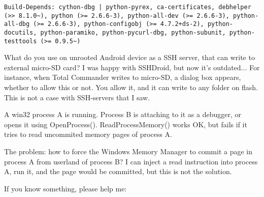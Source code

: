 \begin{lstlisting}
Build-Depends: cython-dbg | python-pyrex, ca-certificates, debhelper (>> 8.1.0~), python (>= 2.6.6-3), python-all-dev (>= 2.6.6-3), python-all-dbg (>= 2.6.6-3), python-configobj (>= 4.7.2+ds-2), python-docutils, python-paramiko, python-pycurl-dbg, python-subunit, python-testtools (>= 0.9.5~)
\end{lstlisting}

\myhrule{}

What do you use on unrooted Android device as a SSH server, that can write to external micro-SD card?
I was happy with SSHDroid, but now it's outdated...
For instance, when Total Commander writes to micro-SD, a dialog box appears, whether to allow this or not.
You allow it, and it can write to any folder on flash.
This is not a case with SSH-servers that I saw.

\myhrule{}

A win32 process A is running.
Process B is attaching to it as a debugger, or opens it using OpenProcess().
ReadProcessMemory() works OK, but fails if it tries to read uncommited memory pages of process A.

The problem: how to force the Windows Memory Manager to commit a page in process A from userland of process B?
I can inject a read instruction into process A, run it, and the page would be committed, but this is not the solution.

\myhrule{}

If you know something, please help me: \EMAIL{}

